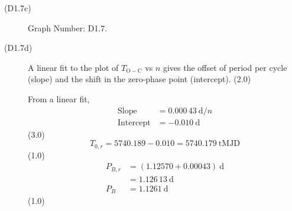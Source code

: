 \begin{description}
\item[(D1.7c)] Graph Number: D1.7.

\item[(D1.7d)] A linear fit to the plot of $T_{\mathrm{O-C}}$ vs $n$ gives
  the offset of period per cycle (slope) and the shift in the zero-phase
  point (intercept). \hfill(2.0)

  From a linear fit,
  \begin{align*}
    \mathrm{Slope} &= 0.000\,43\ \mathrm{d}/n \\
    \mathrm{Intercept} &= -0.010\ \mathrm{d}
  \end{align*}
  \hfill(3.0)
  \[ T_{0,r} = 5740.189 - 0.010 = 5740.179\ \mathrm{tMJD} \]
  \hfill(1.0)
  \begin{align*}
    P_{B,r} &= (1.12570 + 0.00043)\ \mathrm{d} \\
            &= 1.126\,13\ \mathrm{d} \\
    P_B &= 1.1261\ \mathrm{d}
  \end{align*}
  \hfill(1.0)
\end{description}
